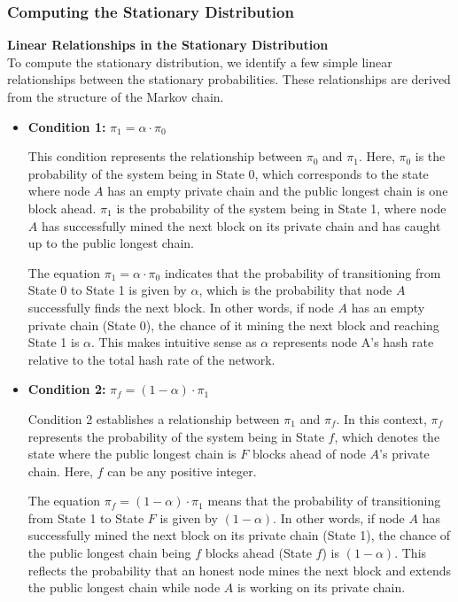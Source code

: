 \subsubsection{Computing the Stationary Distribution}
\textbf{Linear Relationships in the Stationary Distribution}\\
To compute the stationary distribution, we identify a few simple linear relationships between the stationary probabilities. These relationships are derived from the structure of the Markov chain.
\begin{itemize}
    \item \textbf{Condition 1:} $\pi_1 = \alpha \cdot \pi_0$

    This condition represents the relationship between $\pi_0$ and $\pi_1$. Here, $\pi_0$ is the probability of the system being in State 0, which corresponds to the state where node $A$ has an empty private chain and the public longest chain is one block ahead. $\pi_1$ is the probability of the system being in State 1, where node $A$ has successfully mined the next block on its private chain and has caught up to the public longest chain.
    
    The equation $\pi_1 = \alpha \cdot \pi_0$ indicates that the probability of transitioning from State 0 to State 1 is given by $\alpha$, which is the probability that node $A$ successfully finds the next block. In other words, if node $A$ has an empty private chain (State 0), the chance of it mining the next block and reaching State 1 is $\alpha$. This makes intuitive sense as $\alpha$ represents node A's hash rate relative to the total hash rate of the network.
    \item \textbf{Condition 2:} $\pi_f = (1 - \alpha) \cdot \pi_1$

    Condition 2 establishes a relationship between $\pi_1$ and $\pi_f$. In this context, $\pi_f$ represents the probability of the system being in State $f$, which denotes the state where the public longest chain is $F$ blocks ahead of node $A$'s private chain. Here, $f$ can be any positive integer.
    
    The equation $\pi_f = (1 - \alpha) \cdot \pi_1$ means that the probability of transitioning from State 1 to State $F$ is given by $(1 - \alpha)$. In other words, if node $A$ has successfully mined the next block on its private chain (State 1), the chance of the public longest chain being $f$ blocks ahead (State $f$) is $(1 - \alpha)$. This reflects the probability that an honest node mines the next block and extends the public longest chain while node $A$ is working on its private chain.


\end{itemize}
